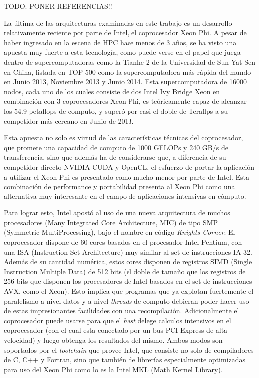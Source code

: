 TODO: PONER REFERENCIAS!!

La última de las arquitecturas examinadas en este trabajo es un desarrollo relativamente reciente
por parte de Intel, el coprocesador Xeon Phi. A pesar de haber ingresado en la escena de HPC hace 
menos de 3 años, se ha visto una apuesta muy fuerte a esta tecnología, como puede verse en el papel 
que juega dentro de supercomputadoras como la Tianhe-2 de la Universidad de Sun Yat-Sen en China,
listada en TOP 500 como la supercomputadora más rápida del mundo en Junio 2013, Noviembre 2013 y
Junio 2014. Esta supercomputadora de 16000 nodos, cada uno de los cuales consiste de dos Intel 
Ivy Bridge Xeon en combinación con 3 coprocesadores Xeon Phi, es teóricamente capaz de alcanzar los
54.9 petaflops de computo, y superó por casi el doble de Teraflps a su competidor más cercano en
Junio de 2013.

Esta apuesta no solo es virtud de las características técnicas del coprocesador, que promete una
capacidad de computo de 1000 GFLOPs y 240 GB/s de transferencia, sino que además ha de considerarse
que, a diferencia de su competidor directo NVIDIA CUDA y OpenCL, el esfuerzo de portar la aplicación a utilizar
el Xeon Phi es presentado como mucho menor por parte de Intel. Esta combinación de performance y portabilidad
presenta al Xeon Phi como una alternativa muy interesante en el campo de aplicaciones intensivas en cómputo.

Para lograr esto, Intel apostó al uso de una nueva arquitectura de muchos procesadores (Many Integrated Core Architecture, MIC) de
tipo SMP (Symmetric MultiProcessing), bajo el nombre en código \textit{Knights Corner}. El coprocesador dispone de 60 cores basados 
en el procesador Intel Pentium, con una ISA (Instruction Set Architecture) muy similar al set de instrucciones IA 32. Además de su cantidad 
numérica, estos cores disponen de registros SIMD (Single Instruction Multiple Data) de 512 bits (el doble de tamaño que los registros de 256
bits que disponen los procesadores de Intel basados en el set de instrucciones AVX, como el Xeon). Esto implica que programas
que ya explotan fuertemente el paralelismo a nivel datos y a nivel \textit{threads} de computo debieran poder hacer uso de 
estas impresionantes facilidades con una recompilación. Adicionalmente el coprocesador puede usarse para que el
\textit{host} delege calculos intensivos en el coprocesador (con el cual esta conectado por un bus
PCI Express de alta velocidad) y luego obtenga los resultados del mismo. Ambos modos son soportados por el \textit{toolchain} que provee
Intel, que consiste no solo de compiladores de C, C++ y Fortran, sino que también de librerías especialmente optimizadas para uso del Xeon Phi 
como lo es la Intel MKL (Math Kernel Library). 

